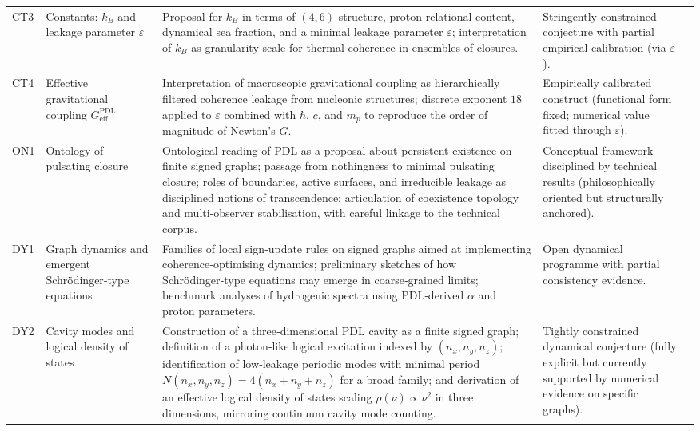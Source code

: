 \documentclass{article}
\newcommand{\PDL}{\mathrm{PDL}}
\begin{document}
\begin{longtable}{L{0.8cm}L{2.5cm}L{5cm}L{3.2cm}L{1cm}}
CT3 &
Constants: $k_B$ and leakage parameter $\varepsilon$ &
Proposal for $k_B$ in terms of $(4,6)$ structure, proton relational content, dynamical sea fraction, and a minimal leakage parameter $\varepsilon$; interpretation of $k_B$ as granularity scale for thermal coherence in ensembles of closures. &
Stringently constrained conjecture with partial empirical calibration (via $\varepsilon$). &
\citep{PDL_Main_2026,Coherence_Leakage_18_2026,PDL_position} \\[0.4em]

CT4 &
Effective gravitational coupling $G_{\mathrm{eff}}^{\PDL}$ &
Interpretation of macroscopic gravitational coupling as hierarchically filtered coherence leakage from nucleonic structures; discrete exponent $18$ applied to $\varepsilon$ combined with $\hbar$, $c$, and $m_p$ to reproduce the order of magnitude of Newton’s $G$. &
Empirically calibrated construct (functional form fixed; numerical value fitted through $\varepsilon$). &
\citep{Exponent_18_PDL_2026,Coherence_Leakage_18_2026,PDL_Main_2026,PDL_position} \\[0.4em]

ON1 &
Ontology of pulsating closure &
Ontological reading of PDL as a proposal about persistent existence on finite signed graphs; passage from nothingness to minimal pulsating closure; roles of boundaries, active surfaces, and irreducible leakage as disciplined notions of transcendence; articulation of coexistence topology and multi‑observer stabilisation, with careful linkage to the technical corpus. &
Conceptual framework disciplined by technical results (philosophically oriented but structurally anchored). &
\citep{ExistencePulsatingClosure2026,PDL_Main_2026,PDL_position,PDL_TO_dialogue} \\[0.4em]

DY1 &
Graph dynamics and emergent Schr\"odinger‑type equations &
Families of local sign‑update rules on signed graphs aimed at implementing coherence‑optimising dynamics; preliminary sketches of how Schr\"odinger‑type equations may emerge in coarse‑grained limits; benchmark analyses of hydrogenic spectra using PDL‑derived $\alpha$ and proton parameters. &
Open dynamical programme with partial consistency evidence. &
\citep{Effective_Fields_PDL_2026,Schrodinger_Sketch_v2_2026,Schrodinger_PDL_v2_2026,PDL_position} \\[0.4em]

DY2 &
Cavity modes and logical density of states &
Construction of a three‑dimensional PDL cavity as a finite signed graph; definition of a photon‑like logical excitation indexed by $(n_x,n_y,n_z)$; identification of low‑leakage periodic modes with minimal period $N(n_x,n_y,n_z)=4(n_x+n_y+n_z)$ for a broad family; and derivation of an effective logical density of states scaling $\rho(\nu)\propto \nu^2$ in three dimensions, mirroring continuum cavity mode counting. &
Tightly constrained dynamical conjecture (fully explicit but currently supported by numerical evidence on specific graphs). &
\citep{PDLCavityModes2026,Effective_Fields_PDL_2026} \\[0.4em]


\end{longtable}
\end{document}
